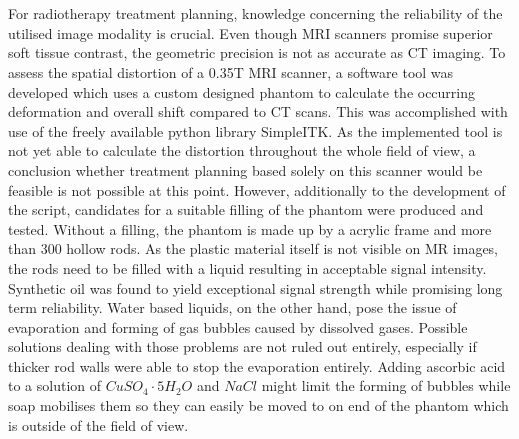 
\let\oldcleardoublepage\cleardoublepage
\renewcommand\cleardoublepage{}

\chapter*{\abstractname}%

For radiotherapy treatment planning, knowledge concerning the reliability of the utilised image modality is crucial.
Even though MRI scanners promise superior soft tissue contrast, the geometric precision is not as accurate as CT imaging.
To assess the spatial distortion of a 0.35T MRI scanner, a software tool was developed which uses a custom designed phantom to calculate the occurring deformation and overall shift compared to CT scans.
This was accomplished with use of the freely available python library SimpleITK.
As the implemented tool is not yet able to calculate the distortion throughout the whole field of view, a conclusion whether treatment planning based solely on this scanner would be feasible is not possible at this point.
However, additionally to the development of the script, candidates for a suitable filling of the phantom were produced and tested.
Without a filling, the phantom is made up by a acrylic frame and more than 300 hollow rods.
As the plastic material itself is not visible on MR images, the rods need to be filled with a liquid resulting in acceptable signal intensity.
Synthetic oil was found to yield exceptional signal strength while promising long term reliability.
Water based liquids, on the other hand, pose the issue of evaporation and forming of gas bubbles caused by dissolved gases.
Possible solutions dealing with those problems are not ruled out entirely, especially if thicker rod walls were able to stop the evaporation entirely.
Adding ascorbic acid to a solution of $CuSO_4\cdot5H_2O$ and $NaCl$ might limit the forming of bubbles while soap mobilises them so they can easily be moved to on end of the phantom which is outside of the field of view. 

\let\cleardoublepage\oldcleardoublepage
\newpage
